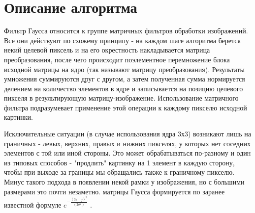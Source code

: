 \documentclass{report}
\begin{document}
\section*{Описание алгоритма}
\par Фильтр Гаусса относится к группе матричных фильтров обработки изображений. Все они действуют по схожему принципу - на каждом шаге алгоритма берется некий целевой пиксель и на его окрестность накладывается матрица преобразования, после чего происходит поэлементное перемножение блока исходной матрицы на ядро (так называют матрицу преобразования). Результаты умножения суммируются друг с другом, а затем полученная сумма нормируется делением на количество элементов в ядре и записывается на позицию целевого пикселя в результирующую матрицу-изображение. Использование матричного фильтра подразумевает применение этой операции к каждому пикселю исходной картинки. 
\par Исключительные ситуации (в случае использования ядра 3х3) возникают лишь на граничных - левых, верхних, правых и нижних пикселях, у которых нет соседних элементов с той или иной стороны. Это может обрабатываться по-разному и один из типовых способов - "продлить" картинку на 1 элемент в каждую сторону, чтобы при выходе за границы мы обращались также к граничному пикселю. Минус такого подхода в появлении некой рамки у изображения, но с большими размерами это почти незаметно. 
 матрицы Гаусса формируется по заранее известной формуле  $e^{- \frac{(3i + j)^2}{(2\sigma^2)}}$ .
\newpage

\end{document}
